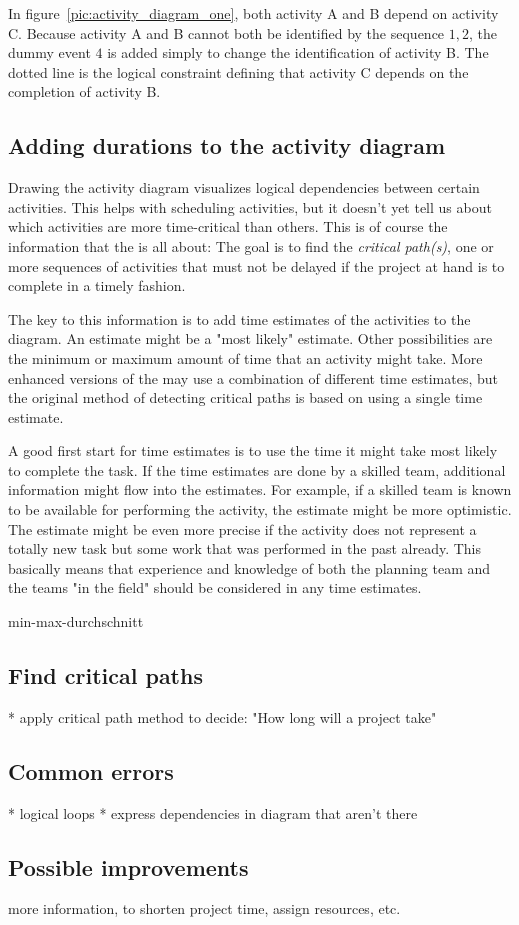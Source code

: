 In figure~\ref{pic:activity_diagram_one}, both activity A and B depend on activity C. Because
activity A and B cannot both be identified by the sequence $1,2$, the dummy event $4$ is added
simply to change the identification of activity B. The dotted line is the logical constraint
defining that activity C depends on the completion of activity B.


\subsection{Adding durations to the activity diagram}
Drawing the activity diagram visualizes logical dependencies between certain activities. This helps
with scheduling activities, but it doesn't yet tell us about which activities are more time-critical
than others. This is of course the information that the \cpm{} is all about: The goal is to find the
\emph{critical path(s)}, one or more sequences of activities that must not be delayed if the project
at hand is to complete in a timely fashion.

The key to this information is to add time estimates of the activities to the diagram. An estimate
might be a "most likely" estimate. Other possibilities are the minimum or maximum amount of time
that an activity might take. More enhanced versions of the \cpm{} may use a combination of different
time estimates, but the original method of detecting critical paths is based on using a single time
estimate. 

A good first start for time estimates is to use the time it might take most likely to complete the
task. If the time estimates are done by a skilled team, additional information might flow into the
estimates. For example, if a skilled team is known to be available for performing the activity, the
estimate might be more optimistic. The estimate might be even more precise if the activity does not
represent a totally new task but some work that was performed in the past already. This basically
means that experience and knowledge of both the planning team and the teams "in the field" should be
considered in any time estimates.

min-max-durchschnitt

\subsection{Find critical paths}\label{sec:Find_criticial_paths}
* apply critical path method to decide: "How long will a project take"

\subsection{Common errors}
* logical loops
* express dependencies in diagram that aren't there

\subsection{Possible improvements}
more information, to shorten project time, assign resources, etc.
